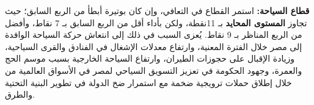 \textbf{قطاع السياحة:} استمر القطاع في التعافي، وإن كان بوتيرة أبطأ من الربع السابق؛ حيث تجاوز \textbf{المستوى المحايد} بـ 11نقطة، ولكن بأداء أقل من الربع السابق بـ 7 نقاط، وأفضل من الربع المناظر بـ 9 نقاط. يُعزى السبب في ذلك إلى انتعاش حركة السياحة الوافدة إلى مصر خلال الفترة المعنية، وارتفاع معدلات الإشغال في الفنادق والقرى السياحية، وزيادة الإقبال على حجوزات الطيران، وارتفاع السياحة الخارجية بسبب موسم الحج والعمرة، وجهود الحكومة في تعزيز التسويق السياحي لمصر في الأسواق العالمية من خلال إطلاق حملات ترويجية ضخمة مع استمرار ضخ الدولة في تطوير البنية التحتية والطرق.
